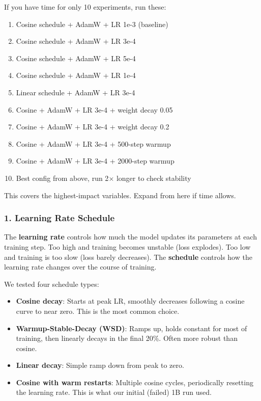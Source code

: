 \documentclass[11pt,a4paper]{article}
\begin{document}
\begin{tip}[title={Your First 10 Proxy Experiments}]
If you have time for only 10 experiments, run these:
\begin{enumerate}[nosep]
  \item Cosine schedule + AdamW + LR 1e-3 (baseline)
  \item Cosine schedule + AdamW + LR 3e-4
  \item Cosine schedule + AdamW + LR 5e-4
  \item Cosine schedule + AdamW + LR 1e-4
  \item Linear schedule + AdamW + LR 3e-4
  \item Cosine + AdamW + LR 3e-4 + weight decay 0.05
  \item Cosine + AdamW + LR 3e-4 + weight decay 0.2
  \item Cosine + AdamW + LR 3e-4 + 500-step warmup
  \item Cosine + AdamW + LR 3e-4 + 2000-step warmup
  \item Best config from above, run 2$\times$ longer to check stability
\end{enumerate}
This covers the highest-impact variables. Expand from here if time allows.
\end{tip}

\subsubsection{1. Learning Rate Schedule}

The \textbf{learning rate} controls how much the model updates its parameters at each training step. Too high and training becomes unstable (loss explodes). Too low and training is too slow (loss barely decreases). The \textbf{schedule} controls how the learning rate changes over the course of training.

We tested four schedule types:

\begin{itemize}
    \item \textbf{Cosine decay}: Starts at peak LR, smoothly decreases following a cosine curve to near zero. This is the most common choice.
    \item \textbf{Warmup-Stable-Decay (WSD)}: Ramps up, holds constant for most of training, then linearly decays in the final 20\%. Often more robust than cosine.
    \item \textbf{Linear decay}: Simple ramp down from peak to zero.
    \item \textbf{Cosine with warm restarts}: Multiple cosine cycles, periodically resetting the learning rate. This is what our initial (failed) 1B run used.
\end{itemize}
\end{document}
